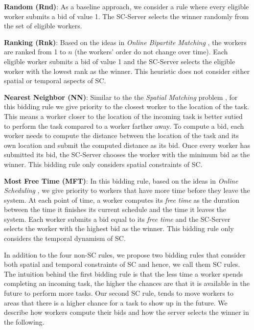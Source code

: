 \noindent\textbf{Random (Rnd)}:
As a baseline approach, we consider a rule where every eligible worker submits a bid of value 1. The SC-Server selects the winner randomly from the set of eligible workers.

\noindent\textbf{Ranking (Rnk)}:
Based on the ideas in \emph{Online Bipartite Matching} \cite{Karp90}, the workers are ranked from 1 to $n$ (the workers' order do not change over time). Each eligible worker submits a bid of value 1 and the SC-Server selects the eligible worker with the lowest rank as the winner. This heuristic does not consider either spatial or temporal aspects of SC.

\noindent\textbf{Nearest Neighbor (NN)}:
Similar to the the \emph{Spatial Matching} problem \cite{Wong07}, for this bidding rule we give priority to the closest worker to the location of the task. This means a worker closer to the location of the incoming task is better sutied to perform the task compared to a worker farther away. To compute a bid, each worker needs to compute the distance between the location of the task and its own location and submit the computed distance as its bid. Once every worker has submitted its bid, the SC-Server chooses the worker with the minimum bid as the winner. This bidding rule only considers spatial constraints of SC.

\noindent\textbf{Most Free Time (MFT)}:
In this bidding rule, based on the ideas in \emph{Online Scheduling} \cite{Lee13}, we give priority to workers that have more time before they leave the system. At each point of time, a worker computes its \emph{free time} as the duration between the time it finishes its current schedule and the time it leaves the system. Each worker submits a bid equal to its \emph{free time} and the SC-Server selects the worker with the highest bid as the winner. This bidding rule only considers the temporal dynamism of SC.
 
In addition to the four non-SC rules, we propose two bidding rules that consider both spatial and temporal constraints of SC and hence, we call them SC rules. The intuition behind the first bidding rule is that the less time a worker spends completing an incoming task, the higher the chances are that it is available in the future to perform more tasks. Our second SC rule, tends to move workers to areas that there is a higher chance for a task to show up in the future. We describe how workers compute their bids and how the server selects the winner in the following.\\

